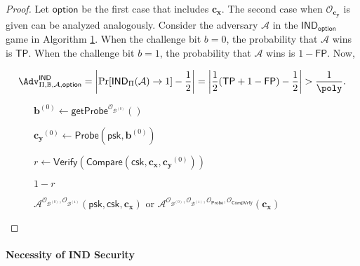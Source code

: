 \begin{proof}

Let $\textsf{option}$ be the first case that includes $\mathbf{c_x}$. The second case when $\mathcal{O}_{\mathbf{c_y}}$ is given can be analyzed analogously. Consider the adversary $\mathcal{A}$ in the $\textsf{IND}_{\textsf{option}}$ game in Algorithm \ref{alg:ind-tp-fp}. When the challenge bit $b = 0$, the probability that $\mathcal{A}$ wins is $\textsf{TP}$. When the challenge bit $b = 1$, the probability that $\mathcal{A}$ wins is $1 - \textsf{FP}$. Now, 

\[
	\Adv_{\Pi, \mathbb{B}, \mathcal{A}, \textsf{option}}^{\textsf{IND}} = \left| \Pr[ \textsf{IND}_\Pi(\mathcal{A}) \to 1 ] - \frac{1}{2} \right| = \left| \frac{1}{2} (\textsf{TP} + 1 - \textsf{FP}) - \frac{1}{2} \right| > \frac{1}{\poly}.
\]

\begin{figure}[h]
\centering

	\begin{minipage}[t]{0.85\textwidth}
	\begin{algorithm}[H]
	\caption{$\mathcal{A}^{\mathcal{O}_{\mathcal{B}^{(0)}}, \mathcal{O}_{\mathcal{B}^{(1)}}} (\mathsf{psk}, \mathsf{csk}, \mathbf{c_x})$ or $\mathcal{A}^{\mathcal{O}_{\mathcal{B}^{(0)}}, \mathcal{O}_{\mathcal{B}^{(1)}}, \mathcal{O}_{\mathsf{Probe}}, \mathcal{O}_{\mathsf{CompVrfy}} } (\mathbf{c_x})$}
	\label{alg:ind-tp-fp}
	\begin{algorithmic}[1]

		\State $\mathbf{b}^{(0)} \gets \mathsf{getProbe}^{\mathcal{O}_{\mathcal{B}^{(0)}}}()$
		
		\State $\mathbf{c_y}^{(0)} \gets \mathsf{Probe}(\mathsf{psk}, \mathbf{b}^{(0)})$ 
		
		\State $r \gets \textsf{Verify}( \textsf{Compare}(\textsf{csk}, \mathbf{c_x}, \mathbf{c_y}^{(0)}) ) $ 
		
		\State \Return $1 - r$
	\end{algorithmic}
	\end{algorithm}
	\end{minipage}

\end{figure}

\end{proof}


\paragraph{Necessity of IND Security}

